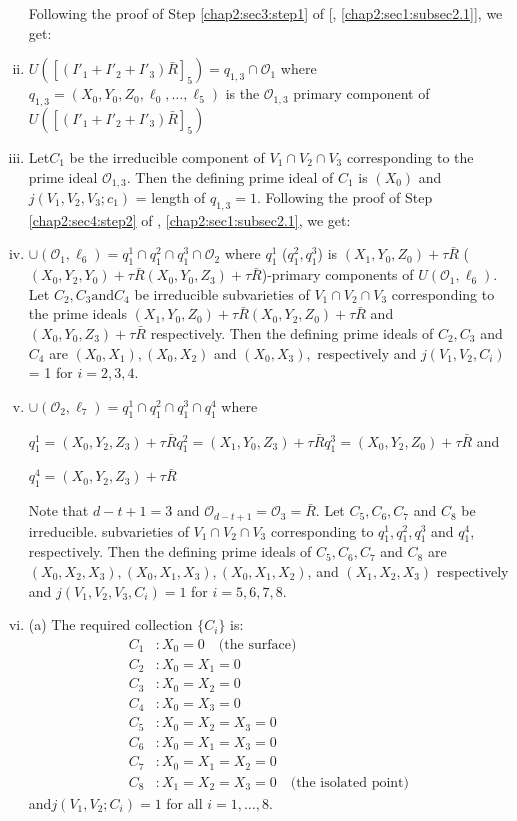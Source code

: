 \begin{enumerate}[(i)]
  Following the proof of Step \ref{chap2:sec3:step1} of [\cite{56},
    \ref{chap2:sec1:subsec2.1}], we get:
\item $U([(I'_1 + I'_2 + I'_3) \bar{R}]_5) = q_{1,3} \cap
    \mathscr{O}_1$ where $ q_{1,3} = (X_0,
    Y_0,Z_0,\ell_0,\ldots,\ell_5)$ is the $\mathscr{O}_{1,3}$ primary
    component of $U([(I'_1 + I'_2 + I'_3) \bar{R}]_5)$ 
\item Let\pageoriginale $C_1$ be the irreducible component of $V_1 \cap V_2 \cap V_3$
    corresponding to the prime ideal $\mathscr{O}_{1,3}$. Then the
    defining prime ideal of $C_1$ is $(X_0)$ and  $j (V_1, V_2,V_3 ;
    c_1)$ = length of $q_{1,3} = 1$. Following the proof of Step
    \ref{chap2:sec4:step2} of \cite{56}, \ref{chap2:sec1:subsec2.1}, we get: 
\item $\cup(\mathscr{O}_1, \ell_6)=  q_1^1 \cap q_1^2 \cap q_1^3 \cap
  \mathscr{O}_2$ where $q_1^1$ (\resp  $q_1^2,q_1^3$) is
  $(X_1,Y_0,Z_0)+ \tau \bar{R}$ (\resp  $(X_0,Y_2,Y_0)+ \tau \bar{R}
  (X_0, Y_0, Z_3)+ \tau \bar{R}$)-primary components of $U
  (\mathscr{O}_1, \ell_6)$. Let $C_2, C_3 
  \text{and} C_4$ be irreducible subvarieties of $V_1 \cap V_2 \cap V_3$
  corresponding to the prime ideals $(X_1,Y_0,Z_0)+ \tau\bar{R}
  (X_0,Y_2,Z_0)+ \tau\bar{R}$ and $(X_0,Y_0,Z_3)+ \tau\bar{R}$
  respectively. Then the defining prime  ideals of $C_2, C_3$ and
  $C_4$ are $(X_0, X_1), (X_0,X_2)$ and $(X_0, X_3),$ respectively and
  $j(V_1,V_2,C_i)$ = 1 for $i = 2,3,4$. 

\item  $\cup(\mathscr{O}_2, \ell_7)=  q_1^1 \cap q_1^2 \cap q_1^3 \cap
  q_1^4 $ where 
  
  $q_1^1 = (X_0,Y_2,Z_3)+ \tau \bar{R} q^2_1 = (X_1,Y_0,Z_3)+\tau \bar{R}
  q_1^3 = (X_0,Y_2,Z_0)+\tau \bar{R}$ and 

  $q_1^4 = (X_0,Y_2,Z_3)+\tau \bar{R}$

  Note that $d-t+1=3$ and $\mathscr{O}_{d-t+1} = \mathscr{O}_3 =
  \bar{R}$. Let $C_5, C_6,C_7$ and $C_8$ be irreducible. subvarieties
  of $V_1 \cap V_2 \cap V_3$ corresponding  to $q_1^1, q^2_1,q^3_1$
  and $q^4_1$, respectively. Then the defining prime ideals of $C_5,
  C_6,C_7$  and $C_8$ are $(X_0,X_2,X_3),
  (X_0,X_1,X_3),(X_0,X_1,X_2)$, and $(X_1,X_2,X_3)$ respectively and
  $j (V_1, V_2,V_3,C_i) = 1$ for  $i= 5,6,7,8$. 
\item (a) The required collection $\{ C_i\}$ is:
  \begin{align*}
    C_1 &: X_0 = 0 \quad \text{(the surface)}\\
    C_2 &: X_0=X_1=0 \\
    C_3 &: X_0 = X_2=0 \\
    C_4 &: X_0 = X_3=0 \\
    C_5 &: X_0 = X_2= X_3 =0\\
    C_6& : X_0 = X_1= X_3 =0 \\
    C_7& : X_0 = X_1= X_2 =0 \\
    C_8& : X_1 = X_2= X_3 =0 \quad \text{(the isolated point)}
  \end{align*}
and\pageoriginale $j(V_1, V_2 ;C_i) = 1$ for all $i = 1,\ldots,8$.


\end{enumerate}
